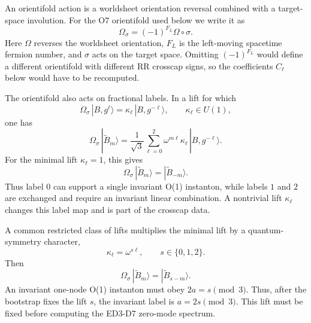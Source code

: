 \documentclass[11pt]{article}
\newcommand{\wt}{\widetilde}
\newcommand{\orient}{\Omega_\sigma}
\begin{document}
An orientifold action is a worldsheet orientation reversal combined with a target-space
involution. For the O7 orientifold used below we write it as
\begin{equation}
  \orient = (-1)^{F_L}\Omega \circ \sigma .
  \label{eq:orientifold-convention}
\end{equation}
Here $\Omega$ reverses the worldsheet orientation, $F_L$ is the left-moving spacetime fermion
number, and $\sigma$ acts on the target space. Omitting $(-1)^{F_L}$ would define a different
orientifold with different RR crosscap signs, so the coefficients $C_\ell$ below would have to
be recomputed.

The orientifold also acts on fractional labels. In a lift for which
\begin{equation}
  \orient\,|B,g^\ell\rangle=\kappa_\ell\,|B,g^{-\ell}\rangle,
  \qquad
  \kappa_\ell\in U(1),
  \label{eq:orientifold-twisted-lift}
\end{equation}
one has
\begin{equation}
  \orient\,|\wt B_m\rangle
  =
  \frac{1}{\sqrt{3}}\sum_{\ell=0}^2
  \omega^{m\ell}\kappa_\ell\,|B,g^{-\ell}\rangle.
  \label{eq:orientifold-label-general}
\end{equation}
For the minimal lift $\kappa_\ell=1$, this gives
\begin{equation}
  \orient\,|\wt B_m\rangle=|\wt B_{-m}\rangle.
  \label{eq:orientifold-label-minimal}
\end{equation}
Thus label $0$ can support a single invariant O(1) instanton, while labels $1$ and $2$ are
exchanged and require an invariant linear combination. A nontrivial lift $\kappa_\ell$ changes
this label map and is part of the crosscap data.

A common restricted class of lifts multiplies the minimal lift by a quantum-symmetry character,
\begin{equation}
  \kappa_\ell=\omega^{s\ell},
  \qquad
  s\in\{0,1,2\}.
  \label{eq:character-lift}
\end{equation}
Then
\begin{equation}
  \orient\,|\wt B_m\rangle=|\wt B_{s-m}\rangle.
  \label{eq:orientifold-label-character}
\end{equation}
An invariant one-node O(1) instanton must obey $2a=s\pmod 3$. Thus, after the bootstrap fixes
the lift $s$, the invariant label is $a=2s\pmod 3$. This lift must be fixed before computing
the ED3-D7 zero-mode spectrum.
\end{document}
